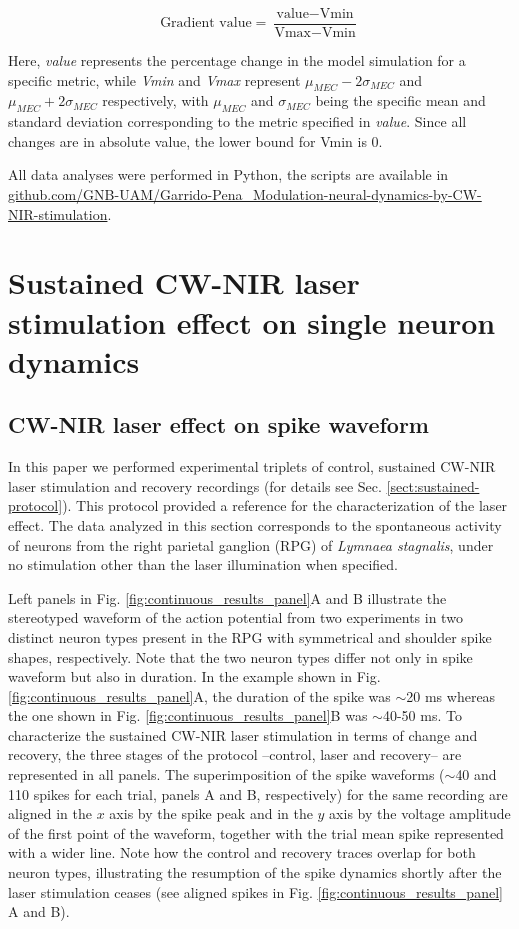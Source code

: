 \[\text{Gradient value} = \frac{\text{value} - \text{Vmin}}{\text{Vmax} - \text{Vmin}}\]

Here, \textit{value} represents the percentage change in the model simulation for a specific metric, while \textit{Vmin} and \textit{Vmax} represent $\mu_{MEC}-2\sigma_{MEC}$ and $\mu_{MEC}+2\sigma_{MEC}$ respectively, with $\mu_{MEC}$ and $\sigma_{MEC}$ being the specific mean and standard deviation corresponding to the metric specified in \textit{value}. Since all changes are in absolute value, the lower bound for Vmin is 0.

All data analyses were performed in Python, the scripts are available in \href{https://github.com/GNB-UAM/Garrido-Pena_Modulation-neural-dynamics-by-CW-NIR-stimulation}{github.com/GNB-UAM/Garrido-Pena\_Modulation-neural-dynamics-by-CW-NIR-stimulation}.


\section{Sustained CW-NIR laser stimulation effect on single neuron dynamics}
\subsection{CW-NIR laser effect on spike waveform}
In this paper we performed experimental triplets of control, sustained CW-NIR laser stimulation and recovery recordings (for details see Sec. \ref{sect:sustained-protocol}). This protocol provided a reference for the characterization of the laser effect. The data analyzed in this section corresponds to the spontaneous activity of neurons from the right parietal ganglion (RPG) of \textit{Lymnaea stagnalis}, under no stimulation other than the laser illumination when specified.

Left panels in Fig. \ref{fig:continuous_results_panel}A and B illustrate the stereotyped waveform of the action potential from two experiments in two distinct neuron types present in the RPG with symmetrical and shoulder spike shapes, respectively. Note that the two neuron types differ not only in spike waveform but also in duration. In the example shown in Fig. \ref{fig:continuous_results_panel}A, the duration of the spike was $\sim$20 ms whereas the one shown in Fig. \ref{fig:continuous_results_panel}B was $\sim$40-50 ms. To characterize the sustained CW-NIR laser stimulation in terms of change and recovery, the three stages of the protocol --control, laser and recovery-- are represented in all panels. The superimposition of the spike waveforms ($\sim$40 and 110 spikes for each trial, panels A and B, respectively) for the same recording are aligned in the $x$ axis by the spike peak and in the $y$ axis by the voltage amplitude of the first point of the waveform, together with the trial mean spike represented with a wider line. Note how the control and recovery traces overlap for both neuron types, illustrating the resumption of the spike dynamics shortly after the laser stimulation ceases (see aligned spikes in Fig. \ref{fig:continuous_results_panel} A and B).

